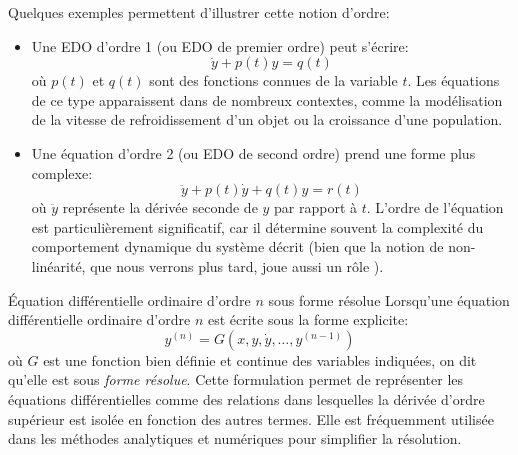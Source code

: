         Quelques exemples permettent d’illustrer cette notion d’ordre:
        \begin{itemize}
            \item Une EDO d'ordre 1 (ou EDO de premier ordre) peut s'écrire: 
            \begin{equation}
                \dot{y} + p(t)y=q(t)
            \end{equation}
            où $p(t)$ et $q(t)$ sont des fonctions connues de la variable $t$. Les équations de ce type apparaissent dans de nombreux contextes, comme la modélisation de la vitesse de refroidissement d'un objet ou la croissance d'une population.
            
            \item Une équation d'ordre 2 (ou EDO de second ordre) prend une forme plus complexe:
            \begin{equation}
                \ddot{y} + p(t)\dot{y} + q(t)y=r(t)
            \end{equation}
            où $\ddot{y}$ représente la dérivée seconde de $y$ par rapport à $t$. L'ordre de l'équation est particulièrement significatif, car il détermine souvent la complexité du comportement dynamique du système décrit (bien que la notion de non-linéarité, que nous verrons plus tard, joue aussi un rôle ).
        \end{itemize}
        
        \begin{definition}{Équation différentielle ordinaire d'ordre $n$ sous forme résolue}\label{def:resolved_form}
            Lorsqu'une équation différentielle ordinaire d'ordre $n$ est écrite sous la forme explicite:
            \begin{equation}
                y^{(n)}=G(x, y, \dot{y}, \ldots, y^{(n-1)})
            \end{equation}
            où $G$ est une fonction bien définie et continue des variables indiquées, on dit qu'elle est sous \textit{forme résolue}. Cette formulation permet de représenter les équations différentielles comme des relations dans lesquelles la dérivée d'ordre supérieur est isolée en fonction des autres termes. Elle est fréquemment utilisée dans les méthodes analytiques et numériques pour simplifier la résolution.
        \end{definition}
        
